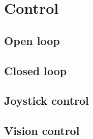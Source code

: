 \section{Control}
\subsection{Open loop}

\subsection{Closed loop}

\subsection{Joystick control}

\subsection{Vision control}
